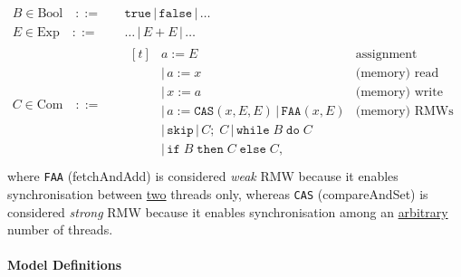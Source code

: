 \documentclass[twocolumn,landscape,10pt]{article}
\theoremstyle{definition}
\begin{document}
\begin{align*}
    B\in \text{Bool}\quad::=& \quad\texttt{true} \,|\, \texttt{false} \,|\, \ldots \\
    E\in \text{Exp}\quad::=&\quad\ldots \,|\, E + E \,|\, \ldots \\
    C\in \text{Com}\quad::=&\quad
    \begin{aligned}[t]
        & a := E & \text{assignment} \\
        & |\,a := x & \text{(memory) read} \\
        & |\,x := a & \text{(memory) write} \\
        & |\,a := \texttt{CAS}(x,E,E)\,|\,\texttt{FAA}(x,E) & \text{(memory) RMWs} \\
        & |\,\texttt{skip}\,|\,C;\;C\,|\,\texttt{while}\;B\;\texttt{do}\;C & \\
        & |\,\texttt{if}\;B\;\texttt{then}\;C\;\texttt{else}\;C, & \\
    \end{aligned}
\end{align*} 
where \texttt{FAA} (fetchAndAdd) is considered \emph{weak}
RMW because it enables synchronisation between \underline{two} threads only,
whereas \texttt{CAS} (compareAndSet) is considered \emph{strong} RMW because it
enables synchronisation among an \underline{arbitrary} number of threads.


\paragraph{Model Definitions}
\end{document}
